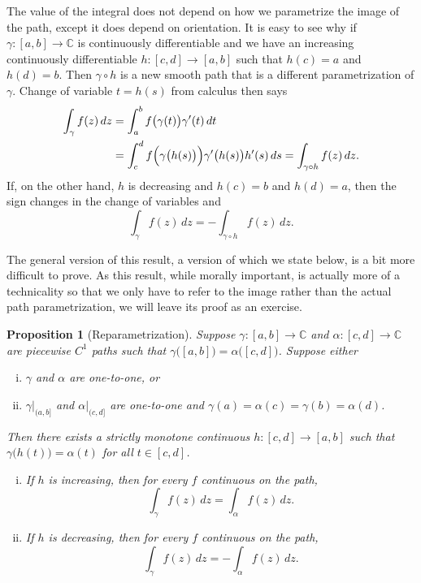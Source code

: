 \documentclass[12pt,openany]{book}
\newcommand{\C}{{\mathbb{C}}}
\theoremstyle{plain}
\newtheorem{prop}[thm]{Proposition}
\theoremstyle{remark}
\theoremstyle{definition}
\theoremstyle{exercise}
\theoremstyle{example}
\begin{document}
The value of the integral does not depend on how we parametrize the image of
the path, except it does depend on orientation.  It is easy to see why if
$\gamma \colon [a,b] \to \C$ is continuously differentiable and we have
an increasing continuously differentiable $h \colon [c,d] \to [a,b]$ such
that $h(c)=a$ and $h(d) = b$.  Then $\gamma \circ h$ is a new
smooth path that is a different parametrization of $\gamma$.
Change of variable $t=h(s)$ from calculus then says
\begin{equation*}
\begin{split}
\int_{\gamma} f(z) \, dz
& =
\int_a^b f\bigl( \gamma(t) \bigr) \gamma'(t) \, dt
\\
& =
\int_c^d f\Bigl( \gamma\bigl(h(s)\bigr) \Bigr) \gamma'\bigl(h(s)\bigr) h'(s) \, ds
=
\int_{\gamma \circ h} f(z) \, dz.
\end{split}
\end{equation*}
If, on the other hand, $h$ is decreasing and $h(c)=b$ and $h(d)=a$, then the
sign changes in the change of variables and
\begin{equation*}
\int_{\gamma} f(z) \, dz =
- \int_{\gamma \circ h} f(z) \, dz.
\end{equation*}

The general version of this result, a version of which we state below,
is a bit more difficult to prove.
As this result, while
morally important, is actually more of a technicality so that we only have
to refer to the image rather than the actual path parametrization, we will
leave its proof as an exercise.

\begin{prop}[Reparametrization]%
Suppose $\gamma \colon [a,b] \to \C$ and $\alpha \colon [c,d] \to \C$ are
piecewise $C^1$ paths such that
$\gamma\bigl([a,b]\bigr) = \alpha\bigl([c,d]\bigr)$.
Suppose either
\begin{enumerate}[(i)]
\item
$\gamma$ and $\alpha$ are one-to-one, or
\item
$\gamma|_{(a,b]}$ and
$\alpha|_{(c,d]}$ are one-to-one and 
$\gamma(a)=\alpha(c)=\gamma(b)=\alpha(d)$.
\end{enumerate}
Then there exists a strictly monotone continuous $h \colon [c,d] \to [a,b]$ such
that $\gamma\bigl(h(t)\bigr) = \alpha(t)$ for all $t \in [c,d]$.
\begin{enumerate}[(i)]
\item
If $h$ is increasing, then for every $f$ continuous on the path,
\begin{equation*}
\int_\gamma f(z) \, dz = \int_{\alpha} f(z) \, dz .
\end{equation*}
\item
If $h$ is decreasing, then for every $f$ continuous on the path,
\begin{equation*}
\int_\gamma f(z) \, dz = - \int_{\alpha} f(z) \, dz .
\end{equation*}
\end{enumerate}
\end{prop}
\end{document}

